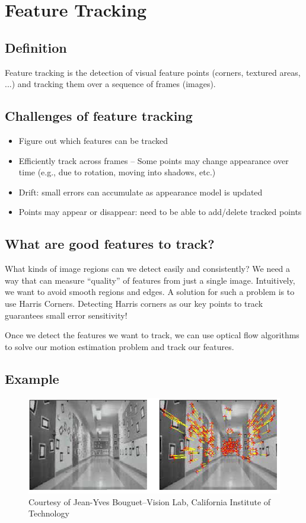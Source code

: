 \documentclass{article}
\begin{document}
\section{Feature Tracking}
\label{gen_inst}

\subsection{Definition}

Feature tracking is the detection of visual feature points (corners, textured areas, ...) and tracking them over a sequence of frames (images).


\subsection{Challenges of feature tracking}

\begin{itemize}
\item Figure out which features can be tracked
\item Efficiently track across frames – Some points may change appearance over time (e.g., due to rotation, moving into shadows, etc.)
\item Drift: small errors can accumulate as appearance model is updated
\item Points may appear or disappear: need to be able to add/delete tracked points
\end{itemize}

\subsection{What are good features to track?}
What kinds of image regions can we detect easily and consistently? 
We need a way that can measure “quality” of features from just a single image. Intuitively, we  want  to  avoid smooth  regions and edges.
A solution for such a problem is to use Harris Corners. Detecting Harris corners as our key points to track guarantees small error sensitivity!

Once we detect the features we want to track, we can use optical flow algorithms to solve our motion estimation problem and track our features.

\subsection{Example}

\begin{figure}[h]
  \centering
  \includegraphics[width=\linewidth]{feature_track_example.PNG}
  \caption{Courtesy of Jean-Yves Bouguet–Vision Lab, California Institute of Technology}
\end{figure}
\end{document}
